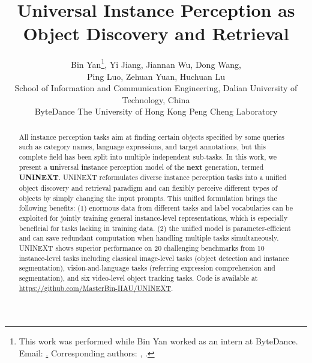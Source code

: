\documentclass[10pt,twocolumn,letterpaper]{article}
\begin{document}
\title{Universal Instance Perception as Object Discovery and Retrieval}



\author{Bin Yan\thanks{This work was performed while Bin Yan worked as an intern at
ByteDance. Email: \href{mailto:yan_bin@mail.dlut.edu.cn}{\color{black}{yan\_bin@mail.dlut.edu.cn}.}  Corresponding authors: \href{mailto:jiangyi.enjoy@bytedance.com}{\color{black}{jiangyi.enjoy@bytedance.com}}, \href{mailto:wdice@dlut.edu.cn}{\color{black}{wdice@dlut.edu.cn}}.},
Yi Jiang,
Jiannan Wu, 
Dong Wang, \\
Ping Luo,
Zehuan Yuan,
Huchuan Lu\\
 School of Information and Communication Engineering, Dalian University of
Technology, China \\
 ByteDance  The University of Hong Kong  Peng Cheng Laboratory
}
\maketitle

\begin{abstract}
All instance perception tasks aim at finding certain objects specified by some queries such as category names, language expressions, and target annotations, but this complete field has been split into multiple independent sub-tasks.
In this work, we present a \textbf{un}iversal \textbf{in}stance perception model of the \textbf{next} generation, termed \textbf{UNINEXT}.
UNINEXT reformulates diverse instance perception tasks into a unified object discovery and retrieval paradigm and can flexibly perceive different types of objects by simply changing the input prompts. This unified formulation brings the following benefits: (1) enormous data from different tasks and label vocabularies can be exploited for jointly training general instance-level representations, which is especially beneficial for tasks lacking in training data. (2)  the unified model is parameter-efficient and can save redundant computation when handling multiple tasks simultaneously.  
UNINEXT shows superior performance on 20 challenging benchmarks from 10 instance-level tasks including classical image-level tasks (object detection and instance segmentation), vision-and-language tasks (referring expression comprehension and segmentation), and six video-level object tracking tasks. 
Code is available at \href{https://github.com/MasterBin-IIAU/UNINEXT}{https://github.com/MasterBin-IIAU/UNINEXT}.

\end{abstract}
\end{document}
